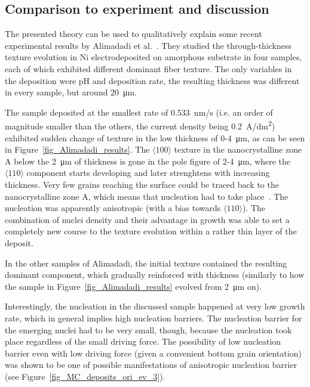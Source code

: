 	\subsection{Comparison to experiment and discussion}\label{sec_MC_to_experiment}
	The presented theory can be used to qualitatively explain some recent experimental results by Alimadadi et al.~\cite{Alimadadi2016}. They studied the through-thickness texture evolution in Ni electrodeposited on amorphous substrate in four samples, each of which exhibited different dominant fiber texture. The only variables in the deposition were pH and deposition rate, the resulting thickness was different in every sample, but around \qty{20}{\um}. 
	
	The sample deposited at the smallest rate of \qty{0.533}{\nano\meter/\second} (i.e. an order of magnitude smaller than the others, the current density being \qty{0.2}{\A/\deci\meter^2}) exhibited sudden change of texture in the low thickness of 0-4~\unit{\um}, as can be seen in Figure~\ref{fig_Alimadadi_results}. The $\langle100\rangle$ texture in the nanocrystalline zone A below the 2~\unit{\um} of thickness is gone in the pole figure of 2-4~\unit{\um}, where the $\langle110\rangle$ component starts developing and later strenghtens with increasing thickness. Very few grains reaching the surface could be traced back to the nanocrystalline zone A, which means that nucleation had to take place~\cite{Alimadadi2016}. The nucleation was apparently anisotropic (with a bias towards $\langle110\rangle$). The combination of nuclei density and their advantage in growth was able to set a completely new course to the texture evolution within a rather thin layer of the deposit. 
	
	In the other samples of Alimadadi, the initial texture contained the resulting dominant component, which gradually reinforced with thickness (similarly to how the sample in Figure~\ref{fig_Alimadadi_results} evolved from \qty{2}{\um} on). 
	
	Interestingly, the nucleation in the discussed sample happened at very low growth rate, which in general implies high nucleation barriers. The nucleation barrier for the emerging nuclei had to be very small, though, because the nucleation took place regardless of the small driving force. The possibility of low nucleation barrier even with low driving force (given a convenient bottom grain orientation) was shown to be one of possible manifestations of anisotropic nucleation barrier (see Figure~\ref{fig_MC_deposits_ori_ev_3}).
	

